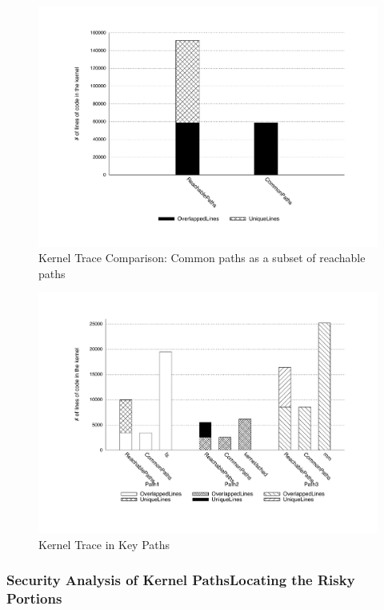 \begin{figure}
	\centering
	\includegraphics[width=1.0\columnwidth]{diagram/lind_oakland16_diagram_01.pdf}
	\caption{Kernel Trace Comparison: Common paths as a subset of reachable paths}
	\label{fig:subset}
	\end{figure}

	\begin{figure}
	\centering
	\includegraphics[width=1.0\columnwidth]{diagram/lind_oakland16_diagram_02.pdf}
	\caption{Kernel Trace in Key Paths}
	\label{fig:key_paths_trace}
\end{figure}

\subsubsection{Security Analysis of Kernel Paths\textendash Locating the
Risky Portions}

